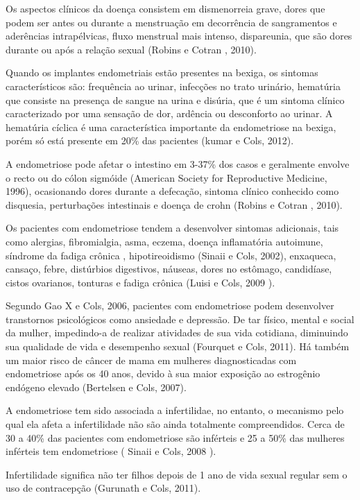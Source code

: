 \documentclass[12pt]{article} %
\begin{document}
Os aspectos clínicos da doença consistem em dismenorreia grave, dores que podem ser antes ou durante a menstruação em decorrência de sangramentos e aderências intrapélvicas, fluxo menstrual mais intenso,
dispareunia, que são dores durante ou após a relação sexual (Robins e Cotran , 2010).

Quando os implantes endometriais estão presentes na bexiga, os sintomas característicos são: frequência ao urinar, infecções no trato urinário, hematúria que consiste na presença de sangue na urina e disúria, que é um sintoma clínico caracterizado por uma sensação de dor, ardência ou desconforto ao urinar.  A hematúria cíclica
é uma característica importante da endometriose na bexiga, porém só
está presente em 20\% das pacientes (kumar e Cols, 2012). 


A endometriose pode afetar o intestino em 3-37\% dos
casos e geralmente envolve o recto ou do cólon sigmóide (American Society for Reproductive Medicine, 1996), ocasionando dores durante a defecação, sintoma clínico conhecido como disquesia, perturbações intestinais e doença de crohn (Robins e Cotran , 2010).

Os pacientes com endometriose tendem a desenvolver sintomas
adicionais, tais como alergias, fibromialgia, asma, eczema, doença
inflamatória autoimune, síndrome da fadiga crônica , hipotireoidismo
(Sinaii e Cols, 2002), enxaqueca, cansaço, febre, distúrbios digestivos, náuseas, dores no estômago,
candidíase, cistos ovarianos, tonturas e fadiga crônica (Luisi e Cols, 2009 ).


Segundo Gao X e Cols, 2006, pacientes com endometriose podem
desenvolver transtornos psicológicos como ansiedade e depressão.
De tar físico, mental e social da mulher, impedindo-a de realizar
atividades de sua vida cotidiana, diminuindo sua qualidade de vida e
desempenho sexual (Fourquet e Cols, 2011). Há também um maior risco de câncer de mama em mulheres diagnosticadas
com endometriose após os 40 anos, devido à sua maior exposição ao
estrogênio endógeno elevado (Bertelsen e Cols, 2007).


A endometriose tem sido associada a infertilidae, no entanto, o mecanismo pelo qual ela afeta a infertilidade não são ainda totalmente compreendidos. Cerca de 30 a 40\% das pacientes com endometriose são inférteis e 25 a 50\% das mulheres inférteis tem endometriose ( Sinaii e Cols, 2008 ).


Infertilidade significa não ter filhos depois de 1 ano de vida sexual regular sem o uso de contracepção (Gurunath e Cols, 2011).
\end{document}
